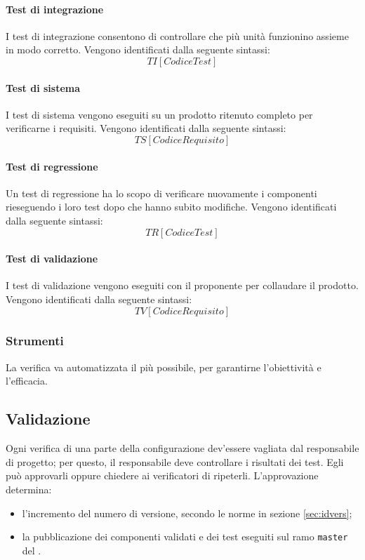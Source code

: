 	\paragraph{Test di integrazione}
		I test di integrazione consentono di controllare che più unità funzionino assieme in modo corretto. Vengono identificati dalla seguente sintassi:
			\[TI[Codice Test]\]
	\paragraph{Test di sistema}
		I test di sistema vengono eseguiti su un prodotto ritenuto completo per verificarne i requisiti. Vengono identificati dalla seguente sintassi:
			\[TS[Codice Requisito]\]
	\paragraph{Test di regressione}
		Un test di regressione ha lo scopo di verificare nuovamente i componenti rieseguendo i loro test dopo che hanno subito modifiche. Vengono identificati dalla seguente sintassi:
			\[TR[Codice Test]\]
	\paragraph{Test di validazione}
		I test di validazione vengono eseguiti con il proponente per collaudare il prodotto. Vengono identificati dalla seguente sintassi:
			\[TV[Codice Requisito]\]

	\subsubsection{Strumenti}
	La verifica va automatizzata il più possibile, per garantirne l'obiettività e l'efficacia. %

\subsection{Validazione}
Ogni verifica di una parte della configurazione dev'essere vagliata dal responsabile di progetto; per questo, il responsabile deve controllare i risultati dei test. Egli può approvarli oppure chiedere ai verificatori di ripeterli. L'approvazione determina:
\begin{itemize}
	\item l'incremento del numero di versione, secondo le norme in sezione \ref{sec:idvers};
	\item la pubblicazione dei componenti validati e dei test eseguiti sul ramo \texttt{master} del .
\end{itemize}



